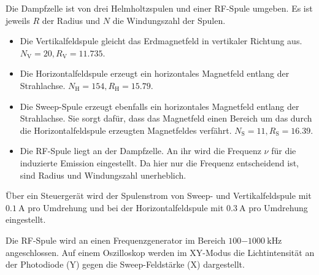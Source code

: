 	Die Dampfzelle ist von drei Helmholtzspulen und einer RF-Spule
	umgeben. Es ist
	jeweils $R$ der Radius und $N$ die Windungszahl der Spulen.
	\begin{itemize}
		\item Die Vertikalfeldspule gleicht das Erdmagnetfeld in
			vertikaler Richtung aus.
			$N_\text{V}=20 ,R_\text{V}=11.735$.
		\item Die Horizontalfeldspule erzeugt ein horizontales
			Magnetfeld entlang der Strahlachse.
			$N_\text{H}= 154,R_\text{H}=15.79$.
		\item Die Sweep-Spule erzeugt ebenfalls ein horizontales
			Magnetfeld entlang der Strahlachse. Sie sorgt dafür, dass
			das Magnetfeld einen Bereich um das durch die
			Horizontalfeldspule erzeugten Magnetfeldes verfährt.
			$N_\text{S}=11 ,R_\text{S}=16.39$.
		\item Die RF-Spule liegt an der Dampfzelle. An ihr
			wird die Frequenz $\nu$ für die induzierte Emission
			eingestellt. Da hier nur die Frequenz entscheidend ist,
			sind Radius und Windungszahl unerheblich.
	\end{itemize}
	Über ein Steuergerät wird der Spulenstrom von Sweep- und
	Vertikalfeldspule mit $\SI{0.1}{\ampere}$ pro Umdrehung und bei
	der Horizontalfeldspule mit $\SI{0.3}{\ampere}$ pro Umdrehung
	eingestellt.

	Die RF-Spule wird an einen Frequenzgenerator im Bereich
	$\SI{100-1000}{\kilo\hertz}$ angeschlossen. Auf einem Oszilloskop
	werden im XY-Modus die Lichtintensität an der Photodiode (Y) gegen
	die Sweep-Feldstärke (X) dargestellt.
